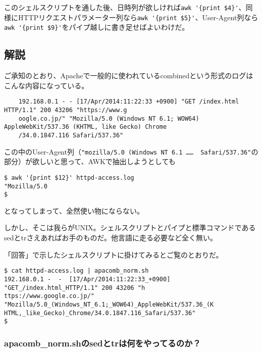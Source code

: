 このシェルスクリプトを通した後、日時列が欲しければ\verb|awk '{print $4}'|、同様にHTTPリクエストパラメーター列なら\verb|awk '{print $5}'|、User-Agent列なら\verb|awk '{print $9}'|をパイプ越しに書き足せばよいわけだ。

\subsection*{解説}

ご承知のとおり、Apacheで一般的に使われているcombinedという形式のログはこんな内容になっている。\\
\begin{frameboxit}{160.0mm}
\begin{verbatim}
	192.168.0.1 - - [17/Apr/2014:11:22:33 +0900] "GET /index.html HTTP/1.1" 200 43206 "https://www.g
	oogle.co.jp/" "Mozilla/5.0 (Windows NT 6.1; WOW64) AppleWebKit/537.36 (KHTML, like Gecko) Chrome
	/34.0.1847.116 Safari/537.36"
\end{verbatim}
\end{frameboxit}

この中のUser-Agent列（\verb|"mozilla/5.0 (Windows NT 6.1 ……  Safari/537.36"|の部分）が欲しいと思って、AWKで抽出しようとしても
\begin{screen}
	\verb|$ awk '{print $12}' httpd-access.log| \return \\
	\verb|"Mozilla/5.0| \\
	\verb|$ |
\end{screen}
となってしまって、全然使い物にならない。

しかし、そこは我らがUNIX。シェルスクリプトとパイプと標準コマンドであるsedとtrさえあればお手のものだ。他言語に走る必要など全く無い。

「回答」で示したシェルスクリプトに掛けてみるとご覧のとおりだ。
\begin{screen}
	\verb!$ cat httpd-access.log | apacomb_norm.sh! \return \\
	\verb|192.168.0.1 -  -  [17/Apr/2014:11:22:33_+0900] "GET_/index.html_HTTP/1.1" 200 43206 "h| \\
	\verb|ttps://www.google.co.jp/" "Mozilla/5.0_(Windows_NT_6.1;_WOW64)_AppleWebKit/537.36_(K| \\
	\verb|HTML,_like_Gecko)_Chrome/34.0.1847.116_Safari/537.36"| \\
	\verb|$ |
\end{screen}

\subsubsection*{apacomb\_{}norm.shのsedとtrは何をやってるのか？}

